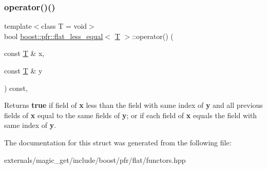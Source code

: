 \subsubsection{\texorpdfstring{operator()()}{operator()()}}
{\footnotesize\ttfamily template$<$class T  = void$>$ \\
bool \mbox{\hyperlink{structboost_1_1pfr_1_1flat__less__equal}{boost\+::pfr\+::flat\+\_\+less\+\_\+equal}}$<$ \mbox{\hyperlink{struct_t}{T}} $>$\+::operator() (\begin{DoxyParamCaption}\item[{const \mbox{\hyperlink{struct_t}{T}} \&}]{x,  }\item[{const \mbox{\hyperlink{struct_t}{T}} \&}]{y }\end{DoxyParamCaption}) const\hspace{0.3cm}{\ttfamily [inline]}, {\ttfamily [noexcept]}}

\begin{DoxyReturn}{Returns}
{\bfseries true} if field of {\bfseries x} less than the field with same index of {\bfseries y} and all previous fields of {\bfseries x} equal to the same fields of {\bfseries y}; or if each field of {\bfseries x} equals the field with same index of {\bfseries y}.
\end{DoxyReturn}


The documentation for this struct was generated from the following file\+:\begin{DoxyCompactItemize}
\item 
externals/magic\+\_\+get/include/boost/pfr/flat/functors.\+hpp\end{DoxyCompactItemize}
